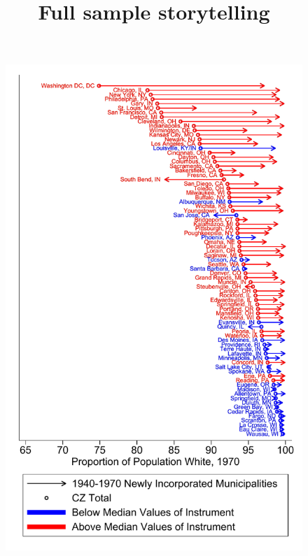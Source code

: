 \documentclass{article}
\title{Full sample storytelling}
\begin{document}
\maketitle



{\footnotesize }
\begin{figure}
	\includegraphics{figures/pcarrow_figure_GM.pdf}
\end{figure}
\clearpage
\end{document}

